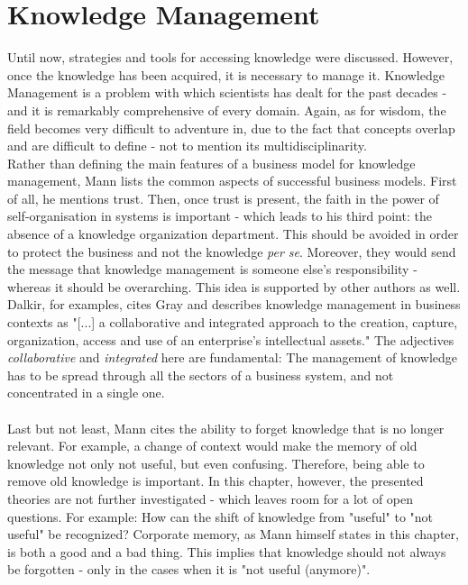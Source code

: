 \chapter{Knowledge Management}
Until now, strategies and tools for accessing knowledge were discussed. However, once the knowledge has been acquired, it is necessary to manage it. Knowledge Management is a problem with which scientists has dealt for the past decades - and it is remarkably comprehensive of every domain. Again, as for wisdom, the field becomes very difficult to adventure in, due to the fact that concepts overlap and are difficult to define - not to mention its multidisciplinarity. 
\\
Rather than defining the main features of a business model for knowledge management, Mann lists the common aspects of successful business models. First of all, he  mentions trust. Then, once trust is present, the faith in the power of self-organisation in systems is important - which leads to his third point: the absence of a knowledge organization department. This should be avoided in order to protect the business and not the knowledge \textit{per se}. Moreover, they would send the message that knowledge management is someone else's responsibility - whereas it should be overarching. This idea is supported by other authors as well. Dalkir, for examples, cites Gray and describes knowledge management in business contexts as "[...] a collaborative and integrated approach to the creation, capture, organization, access and use of an enterprise’s intellectual assets." \cite{KMTP} The adjectives \textit{collaborative} and \textit{integrated} here are fundamental: The management of knowledge has to be spread through all the sectors of a business system, and not concentrated in a single one.\\ \\ Last but not least, Mann cites the ability to forget knowledge that is no longer relevant. For example, a change of context would make the memory of old knowledge not only not useful, but even confusing. Therefore, being able to remove old knowledge is important. In this chapter, however, the presented theories are not further investigated - which leaves room for a lot of open questions. For example: How can the shift of knowledge from "useful" to "not useful" be recognized? Corporate memory, as Mann himself states in this chapter, is both a good and a bad thing. This implies that knowledge should not always be forgotten - only in the cases when it is "not useful (anymore)". 
